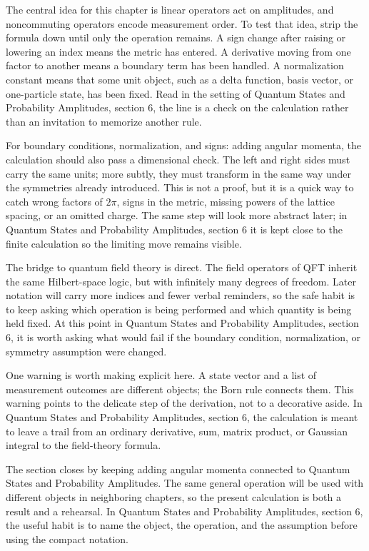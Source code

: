 The central idea for this chapter is linear operators act on amplitudes, and noncommuting operators encode measurement order.  To test that idea, strip the formula down until only the operation remains.  A sign change after raising or lowering an index means the metric has entered.  A derivative moving from one factor to another means a boundary term has been handled.  A normalization constant means that some unit object, such as a delta function, basis vector, or one-particle state, has been fixed.  Read in the setting of Quantum States and Probability Amplitudes, section 6, the line is a check on the calculation rather than an invitation to memorize another rule.

For boundary conditions, normalization, and signs: adding angular momenta, the calculation should also pass a dimensional check.  The left and right sides must carry the same units; more subtly, they must transform in the same way under the symmetries already introduced.  This is not a proof, but it is a quick way to catch wrong factors of \(2\pi\), signs in the metric, missing powers of the lattice spacing, or an omitted charge.  The same step will look more abstract later; in Quantum States and Probability Amplitudes, section 6 it is kept close to the finite calculation so the limiting move remains visible.

The bridge to quantum field theory is direct.  The field operators of QFT inherit the same Hilbert-space logic, but with infinitely many degrees of freedom.  Later notation will carry more indices and fewer verbal reminders, so the safe habit is to keep asking which operation is being performed and which quantity is being held fixed.  At this point in Quantum States and Probability Amplitudes, section 6, it is worth asking what would fail if the boundary condition, normalization, or symmetry assumption were changed.

One warning is worth making explicit here.  A state vector and a list of measurement outcomes are different objects; the Born rule connects them.  This warning points to the delicate step of the derivation, not to a decorative aside.  In Quantum States and Probability Amplitudes, section 6, the calculation is meant to leave a trail from an ordinary derivative, sum, matrix product, or Gaussian integral to the field-theory formula.

The section closes by keeping adding angular momenta connected to Quantum States and Probability Amplitudes.  The same general operation will be used with different objects in neighboring chapters, so the present calculation is both a result and a rehearsal.  In Quantum States and Probability Amplitudes, section 6, the useful habit is to name the object, the operation, and the assumption before using the compact notation.



